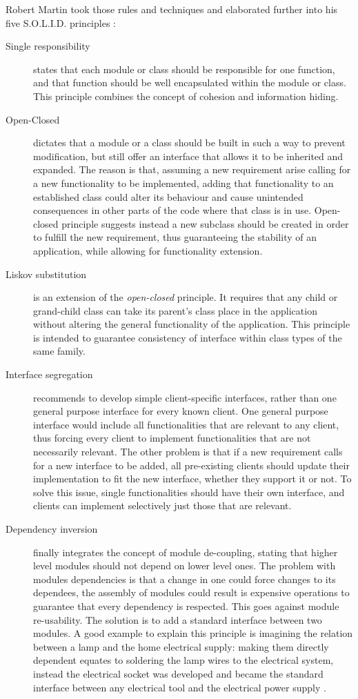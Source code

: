 Robert Martin took those rules and techniques and elaborated further into his
five S.O.L.I.D. principles \cite{RM03}:
\begin{description}
\item [Single responsibility] states that each module or class should be
responsible for one function, and that function should be well encapsulated
within the module or class. This principle combines the concept of cohesion and
information hiding.
\item [Open-Closed] dictates that a module or a class should be built in such a
way to prevent modification, but still offer an interface that allows it to be
inherited and expanded. The reason is that, assuming a new requirement arise
calling for a new functionality to be implemented, adding that functionality
to an established class could alter its behaviour and cause unintended
consequences in other parts of the code where that class is in use. Open-closed
principle suggests instead a new subclass should be created in order
to fulfill the new requirement, thus guaranteeing the stability of an
application, while allowing for functionality extension.
\item [Liskov substitution] is an extension of the \emph{open-closed} principle.
It requires that any child or grand-child class can take its parent's class
place in the application without altering the general functionality of the
application. This principle is intended to guarantee consistency of interface
within class types of the same family.
\item [Interface segregation] recommends to develop simple
client-specific interfaces, rather than one general purpose interface for every
known client. One general purpose interface would include all functionalities
that are relevant to any client, thus forcing every client to implement
functionalities that are not necessarily relevant. The other problem is that if
a new requirement calls for a new interface to be added, all pre-existing
clients should update their implementation to fit the new interface, whether
they support it or not. To solve this issue, single functionalities should have
their own interface, and clients can implement selectively just those that are
relevant.
\item [Dependency inversion] finally integrates the concept of module
de-coupling, stating that higher level modules should not depend on lower level
ones. The problem with modules dependencies is that a change in one could force
changes to its dependees, the assembly of modules could result is expensive
operations to guarantee that every dependency is respected. This goes against
module re-usability. The solution is to add a standard interface between two
modules. A good example to explain this principle is imagining the relation
between a lamp and the home electrical supply: making them directly dependent
equates to soldering the lamp wires to the electrical system, instead the
electrical socket was developed and became the standard interface between any
electrical tool and the electrical power supply \cite{RP05}.
\end{description}

